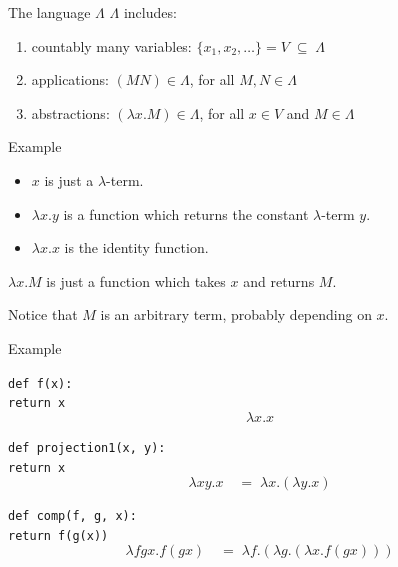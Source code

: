 \documentclass{beamer}
\begin{document}
\begin{frame}[t]{\subLambda}
	\begin{block}{The language $\Lambda$}
		$\Lambda$ includes:
		\begin{enumerate}
			\item countably many variables: \quad $\{ x_1, x_2, \dots \} = V \;\subseteq\; \Lambda$
			\pause
			\item applications: \quad $(MN) \in \Lambda$, \quad for all $M, N \in \Lambda$
			\item abstractions: \quad $(\lambda x. M) \in \Lambda$, \quad for all $x \in V$ and $M \in \Lambda$
		\end{enumerate}
		\vspace{1ex}
	\end{block}
	\pause
	\begin{exampleblock}{Example}
		\begin{itemize}
			\item $x$ is just a $\lambda$-term.
			\item $\lambda x. y$ is a function which returns the constant $\lambda$-term $y$.
			\item $\lambda x. x$ is the identity function.
		\end{itemize}
	\end{exampleblock}
\end{frame}

\begin{frame}[t]{\subLambda}
	$\lambda x. M$ is just a function which takes $x$ and returns $M$.
	
	\pause
	Notice that $M$ is an arbitrary term, probably depending on $x$.
	\pause
	\begin{exampleblock}{Example}
		\vspace{-1ex}
		\begin{multicols}{2}
			\texttt{def f(x):}\\
				\quad \texttt{return x}
			\columnbreak
			\[ \lambda x. x \]
		\end{multicols}
		\pause
		\begin{multicols}{2}
			\texttt{def projection1(x, y):}\\
				\quad \texttt{return x}
			\columnbreak
			\[ \lambda x y. x  \quad = \;  \lambda x. (\lambda y. x)\]
		\end{multicols}
		\pause
		\begin{multicols}{2}
			\texttt{def comp(f, g, x):}\\
				\quad \texttt{return f(g(x))}
			\columnbreak
			\[ \lambda f g x. f (g x) \quad = \; \lambda f. (\lambda g. (\lambda x. f (g x))) \]
		\end{multicols}
	\end{exampleblock}
\end{frame}
\end{document}
